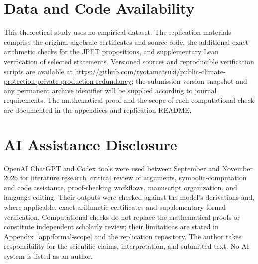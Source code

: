 \documentclass[11pt]{article}
\theoremstyle{remark}
\begin{document}
\section*{Data and Code Availability}
This theoretical study uses no empirical dataset. The replication materials comprise the original algebraic certificates and source code, the additional exact-arithmetic checks for the JPET propositions, and supplementary Lean verification of selected statements. Versioned sources and reproducible verification scripts are available at \url{https://github.com/ryotamatsuki/public-climate-protection-private-production-redundancy}; the submission-version snapshot and any permanent archive identifier will be supplied according to journal requirements. The mathematical proof and the scope of each computational check are documented in the appendices and replication README.

\section*{AI Assistance Disclosure}
OpenAI ChatGPT and Codex tools were used between September and November 2026 for literature research, critical review of arguments, symbolic-computation and code assistance, proof-checking workflows, manuscript organization, and language editing. Their outputs were checked against the model's derivations and, where applicable, exact-arithmetic certificates and supplementary formal verification. Computational checks do not replace the mathematical proofs or constitute independent scholarly review; their limitations are stated in Appendix~\ref{app:formal-scope} and the replication repository. The author takes responsibility for the scientific claims, interpretation, and submitted text. No AI system is listed as an author.

\appendix





\end{document}
